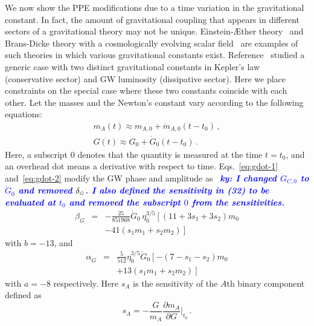 \documentclass[prd,twocolumn,nofootinbib]{revtex4-1}
\newcommand\be{\begin{equation}}
\newcommand\ee{\end{equation}}
\newcommand{\Gdot}{{\mbox{\tiny $\dot G$}}}
\newcommand{\ky}[1]{\textcolor{blue}{\it{\textbf{ky: #1}}} }
\begin{document}
We now show the PPE modifications due to a time variation in the gravitational constant. In fact, the amount of gravitational coupling that appears in different sectors of a  gravitational theory may not be unique. Einstein-\AE ther theory~\cite{Yagi:2013ava} and Brans-Dicke theory with a cosmologically evolving scalar field~\cite{Will2006} are examples of such theories in which various gravitational constants exist. Reference~\cite{Tahura:2018zuq} studied a generic case with two distinct gravitational constants in Kepler's law (conservative sector) and GW luminosity (dissipative sector). Here we place constraints on the special case where these two constants coincide with each other. Let the masses and the Newton's constant vary according to the following equations:
 \begin{eqnarray}\label{eq:gdot-1}
 m_A(t)\approx m_{A,0}+\dot{m}_{A,0}(t-t_0)\,, \\\label{eq:gdot-2}
   \label{eq:3.7a4}  G(t)\approx  G_{0}+\dot{G}_{0}(t-t_0)\,.
 \end{eqnarray}
 Here, a subscript $0$ denotes that the quantity is measured at the time $t=t_0$, and an overhead dot means a derivative with respect to time. Eqs.~\eqref{eq:gdot-1} and~\eqref{eq:gdot-2} modify the GW phase and amplitude as~\cite{Tahura:2018zuq} \ky{I changed $\dot{G}_{C,0}$ to $\dot{G}_{0}$ and removed $\delta_\Gdot$. I also defined the sensitivity in (32) to be evaluated at $t_0$ and removed the subscript $0$ from the sensitivities.}
 \begin{eqnarray}\label{eq:beta_gdot}
 \beta_{\dot{G}}&=&-\frac{25}{851968}\dot{G}_{0}\,\eta_0^{3/5}\left[(11+3s_1+3s_2)m_0 \right. \nonumber \\
 && \left. -41 (s_{1}m_{1}+s_{2}m_{2})\right]\,
  \end{eqnarray} 
with $b=-13$, and 
\begin{eqnarray}\label{eq:alpha_gdot}
\label{eq:3.7d2}
 \alpha_{\dot{G}}&=&\frac{5}{512}\eta_0^{3/5}\dot{G}_{0}\left[-(7-s_1-s_2)m_0 \right. \nonumber \\
 && \left.+13 (s_{1}m_{1}+s_{2}m_{2})\right]\, 
 \end{eqnarray}
with $a=-8$ respectively. Here $s_A$ is the sensitivity of the $A$th binary component defined as
\be
s_A=-\frac{G}{m_A}\frac{\partial m_A}{\partial  G}\bigg|_{t_0}\,.
\ee
 
\end{document}
